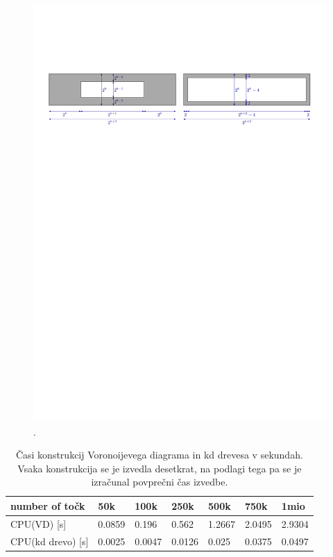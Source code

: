 \documentclass[a4paper, 12pt]{book}
\begin{document}
\begin{figure}
\centerline{\includegraphics[scale=0.75, page=2]{pics/data_generation.pdf}}
\caption{. }
\label{generation}
\end{figure}

\begin{table}
\begin{center}
\begin{tabular}{l|l|l|l|l|l|l}
\hline
number of točk & 50k & 100k & 250k & 500k & 750k & 1mio \\ \hline \hline
CPU(VD) [s] & 0.0859 & 0.196 & 0.562 & 1.2667 & 2.0495 & 2.9304 \\ \hline
CPU(kd drevo) [s] & 0.0025 & 0.0047 & 0.0126 & 0.025 & 0.0375 & 0.0497
\end{tabular}
\end{center}
\label{cpu_compare}
\caption{Časi konstrukcij Voronoijevega diagrama in kd drevesa v sekundah. Vsaka konstrukcija se je izvedla desetkrat, na podlagi tega pa se je izračunal povprečni čas izvedbe.}
\end{table}
\end{document}
